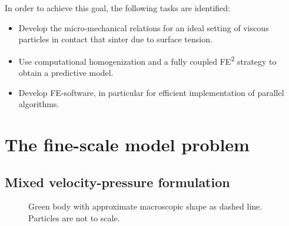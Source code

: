 \documentclass[MikaelDissertation.tex]{subfiles}
\begin{document}
In order to achieve this goal, the following tasks are identified:
\begin{itemize}
 \item Develop the micro-mechanical relations for an ideal setting of viscous particles in contact that sinter due to surface tension.
 \item Use computational homogenization and a fully coupled FE\textsuperscript{2} strategy to obtain a predictive model.
 \item Develop FE-software, in particular for efficient implementation of parallel algorithms.
\end{itemize}

\chapter{The fine-scale model problem}

\section{Mixed velocity-pressure formulation}

\begin{figure}[htpb!]
\centering
{}
\caption{Green body with approximate macroscopic shape as dashed line. Particles are not to scale.}
\label{fig:greenbody}
\end{figure}
\end{document}
